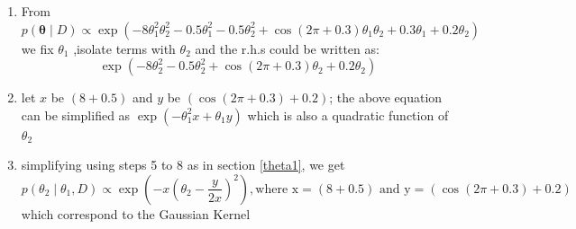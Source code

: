 \documentclass[12pt]{article}
\begin{document}
\begin{enumerate}
    \item From
$p(\boldsymbol{\theta} \mid D) \propto \exp\left(-8\theta_1^2\theta_2^2 - 0.5\theta_1^2 - 0.5\theta_2^2 + \cos(2\pi + 0.3)\theta_1\theta_2 + 0.3\theta_1 + 0.2\theta_2 \right)$ we fix $\theta_1$ ,isolate terms with $\theta_2$ and the r.h.s could be written as:
\[\exp\left(-8\theta_2^2 - 0.5\theta_2^2 + \cos(2\pi + 0.3)\theta_2 + 0.2\theta_2 \right)\]
    \item let $x$ be $\left(8 +0.5\right)$ and $y$ be $\left(\cos(2\pi + 0.3)+ 0.2\right)$; the above equation can be simplified as $\exp\left(-\theta_1^2x+ \theta_1y\right)$ which is also a quadratic function of $\theta_2$
    \item simplifying using steps 5 to 8 as in section \ref{theta1}, we get
    \[ p(\theta_2 \mid \theta_1, D) \propto \exp\left(-x\left(\theta_2 - \frac{y}{2x}\right)^2\right), \text {where x} =\left(8 +0.5\right) \text { and y} = \left(\cos(2\pi + 0.3)+ 0.2\right)\] 
    which correspond to the Gaussian Kernel
\end{enumerate}
\end{document}
